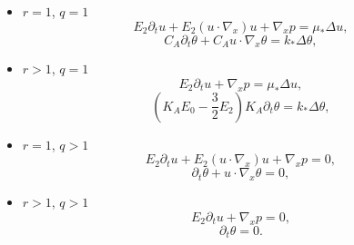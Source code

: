 \begin{theorem}
\begin{itemize}
 \item $r=1$, $q=1$
\begin{equation} E_2\partial_t u+ E_{2} (u\cdot \nabla_x) u  
 +\nabla_x p
=\mu_\ast\Delta u,  \label{eq:incU11}\end{equation}
\begin{equation} 
C_A\partial_t \theta + C_A u\cdot \nabla_x\theta= k_\ast\Delta\theta,
 \label{eq:incTH11}\end{equation}
\item $r>1$, $q=1$
\begin{equation}E_2\partial_t   u+\nabla_x p= \mu_\ast\Delta u,\label{eq:incU21}\end{equation}
\begin{equation}
\left( K_AE_0 -\frac{3}{2}  E_2 \right)K_A\partial_t \theta  = k_\ast\Delta\theta, \label{eq:incTH21}\end{equation}

\item $ r=1$, $q>1$ \begin{equation}E_2\partial_t u+ {E_{2}} (u\cdot \nabla_x) u +\nabla_x p= 0,\label{eq:incU12}\end{equation}
\begin{equation} 
 \partial_t \theta +  u\cdot \nabla_x\theta=0,\label{eq:incTH12}
\end{equation}
\item $r>1$, $q>1$ \begin{equation}
E_2\partial_t u+\nabla_x p= 0,\label{eq:incU22} \end{equation}
\begin{equation}
\partial_t \theta = 0.\label{eq:incTH22}
 \end{equation} 

\end{itemize}
 

\end{theorem}
